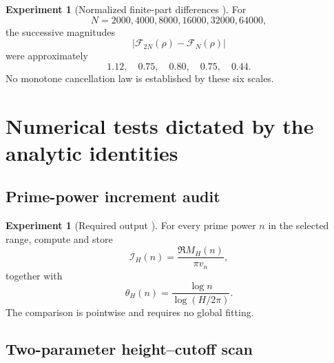 \documentclass[11pt]{amsart}
\numberwithin{equation}{section}
\theoremstyle{plain}
\theoremstyle{definition}
\newtheorem{experiment}[theorem]{Experiment}
\theoremstyle{remark}
\newcommand{\1}{\mathbf{1}}
\begin{document}
\begin{experiment}[Normalized finite-part differences {\normalfont[Numerical]}]
\label{exp:numerical_finite_part_scale_scan_detailed}
For
\begin{equation}
N=2000,4000,8000,16000,32000,64000,
\label{eq:numerical_finite_part_N_values}
\end{equation}
the successive magnitudes
\begin{equation}
|\mathcal F_{2N}(\rho)-\mathcal F_N(\rho)|
\label{eq:numerical_finite_part_difference_definition}
\end{equation}
were approximately
\begin{equation}
1.12,
\quad0.75,
\quad0.80,
\quad0.75,
\quad0.44.
\label{eq:numerical_finite_part_difference_values}
\end{equation}
No monotone cancellation law is established by these six scales.
\end{experiment}

\section{Numerical tests dictated by the analytic identities}
\label{sec:numerical_next_tests}

\subsection{Prime-power increment audit}
\label{subsec:numerical_increment_audit}

\begin{experiment}[Required output {\normalfont[Numerical]}]
\label{exp:required_increment_output}
For every prime power $n$ in the selected range, compute and store
\begin{equation}
\mathcal I_H(n)
=
\frac{\Re M_H(n)}{\pi v_n},
\label{eq:numerical_increment_output}
\end{equation}
together with
\begin{equation}
\theta_H(n)
=
\frac{\log n}{\log(H/2\pi)}.
\label{eq:numerical_theta_output}
\end{equation}
The comparison is pointwise and requires no global fitting.
\end{experiment}

\subsection{Two-parameter height--cutoff scan}
\label{subsec:numerical_two_parameter_scan}
\end{document}
